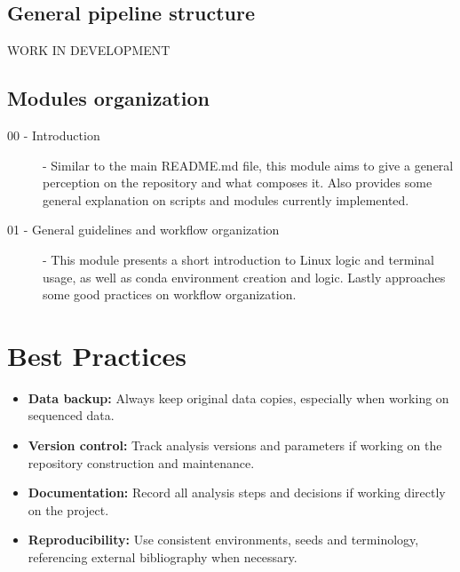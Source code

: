 \documentclass[a4paper,11pt]{article}
\begin{document}
\subsection{General pipeline structure}
WORK IN DEVELOPMENT
\subsection{Modules organization}
\begin{description}
    \item[00 - Introduction] - Similar to the main README.md file, this module
        aims to give a general perception on the repository and what composes
        it. Also provides some general explanation on scripts and modules
       currently implemented.
    \item[01 - General guidelines and workflow organization] - This module
        presents a short introduction to Linux logic and terminal usage, as well
        as conda environment creation and logic. Lastly approaches some good
        practices on workflow organization.
\end{description}
\section{Best Practices}
\begin{itemize}
    \item \textbf{Data backup:} Always keep original data copies, especially
        when working on sequenced data.
    \item \textbf{Version control:} Track analysis versions and parameters if
        working on the repository construction and maintenance.
    \item \textbf{Documentation:} Record all analysis steps and decisions if
        working directly on the project.
    \item \textbf{Reproducibility:} Use consistent environments, seeds and
        terminology, referencing external bibliography when necessary.
\end{itemize}

\newpage
\printbibliography
\end{document}
